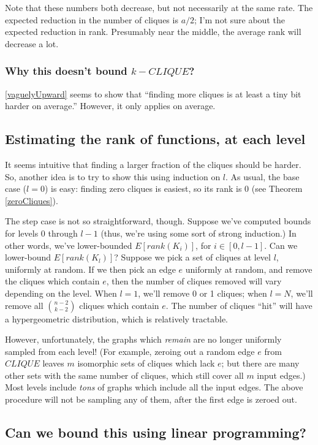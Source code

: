 \documentclass[12pt]{article}
\theoremstyle{definition}
\begin{document}
Note that these numbers both decrease, but not necessarily at the same rate.
The expected reduction in the number of cliques is $a/2$; I'm not sure
about the expected reduction in rank. Presumably near the middle, the
average rank will decrease a lot.

\subsubsection{Why this doesn't bound $k-CLIQUE$?}

\ref{vaguelyUpward} seems to show that ``finding more cliques is
at least a tiny bit harder on average.'' However, it only applies
on average.

\subsection{Estimating the rank of functions, at each level}

It seems intuitive that finding a larger fraction of the cliques
should be harder.
So, another idea is to try to show this using induction on $l$.
As usual, the base case ($l=0$) is easy: finding zero cliques is easiest,
so its rank is 0 (see Theorem \ref{zeroCliques}).

The step case is not so straightforward, though. Suppose we've computed bounds for
levels 0 through $l-1$ (thus, we're using some sort of strong induction.)
In other words, we've lower-bounded $E[rank(K_i)]$, for $i \in [0,l-1]$.
Can we lower-bound $E[rank(K_l)]$?
Suppose we pick a set of cliques at level $l$, uniformly at random.
If we then pick an edge $e$ uniformly at random, and remove the cliques
which contain $e$, then the number of cliques removed will vary
depending on the level. When $l=1$, we'll remove 0 or 1 cliques; when $l=N$,
we'll remove all ${n-2 \choose k-2}$ cliques which contain $e$.
The number of cliques ``hit'' will have a hypergeometric distribution,
which is relatively tractable.

However, unfortunately, the graphs which {\em remain} are no longer uniformly
sampled from each level!
(For example, zeroing out a random edge $e$ from $CLIQUE$
leaves $m$ isomorphic sets of cliques which lack $e$; but there are many other
sets with the same number of cliques, which still cover all $m$ input edges.)
Most levels include {\em tons} of
graphs which include all the input edges. The above procedure will not
be sampling any of them, after the first edge is zeroed out.

\subsection{Can we bound this using linear programming?}
\end{document}
